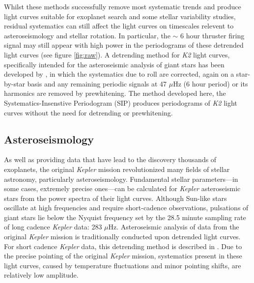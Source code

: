 \documentclass[useAMS, usenatbib, preprint, 12pt]{aastex}
\begin{document}
Whilst these methods successfully remove most systematic trends and
produce light curves suitable for exoplanet search and some stellar
variability studies, residual systematics can still affect the light curves on
timescales relevent to asteroseismology and stellar rotation.
In particular, the $\sim$ 6 hour thruster firing signal may still appear
with high power in the periodograms of these detrended light curves
(see figure \ref{fig:raw}).
A detrending method for {\it K2} light curves, specifically intended for the
asteroseismic analysis of giant stars has been developed by \citet{Lund2015},
in which the systematics due to roll are corrected, again on
a star-by-star basis and any remaining periodic signals at 47 $\mu$Hz (6 hour
period) or its harmonics are removed by prewhitening.
The method developed here, the Systematics-Insenstive Periodogram (SIP)
produces periodograms of {\it K2} light curves without the need for detrending
or prewhitening.

\subsection{Asteroseismology}

As well as providing data that have lead to the discovery thousands of
exoplanets, the original {\it Kepler} mission revolutionized many fields of
stellar astronomy, particularly asteroseismology.
Fundamental stellar parameters---in some cases, extremely precise ones---can
be calculated for {\it Kepler} asteroseismic stars from the power spectra of
their light curves.
Although Sun-like stars oscillate at high frequencies and require
short-cadence observations, pulsations of giant stars lie below the Nyquist
frequency set by the 28.5 minute sampling rate of long cadence {\it Kepler}
data: 283 $\mu$Hz.
Asteroseismic analysis of data from the original {\it Kepler} mission is
traditionally conducted upon detrended light curves.
For short cadence {\it Kepler} data, this detrending method is described in
\citet{Garcia2011}.
Due to the precise pointing of the original {\it Kepler} mission, systematics
present in these light curves, caused by temperature fluctuations and minor
pointing shifts, are relatively low amplitude.
\end{document}
